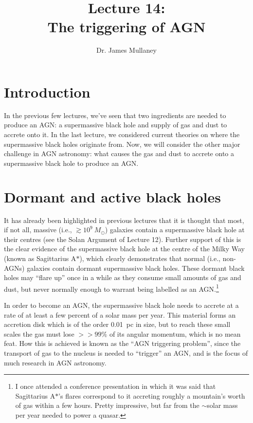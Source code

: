 \documentclass[11pt]{article}
\begin{document}
 
\title{Lecture 14:\\The triggering of AGN}
\author{Dr. James Mullaney}
\maketitle

\section{Introduction}
In the previous few lectures, we've seen that two ingredients
are needed to produce an AGN: a supermassive black hole and supply of
gas and dust to accrete onto it. In the last lecture, we considered
current theories on where the supermassive black holes originate from. Now,
we will consider the other major challenge in AGN astronomy: what
causes the gas and dust to accrete onto a supermassive black hole to
produce an AGN.

\section{Dormant and active black holes}
It has already been highlighted in previous lectures that it is
thought that most, if not all, massive (i.e., $\gtrsim10^9~{M_\odot}$)
galaxies contain a supermassive black hole at their centres (see the
Solan Argument of Lecture 12). Further support of this is the clear
evidence of the supermassive black hole at the centre of the Milky Way
(known as Sagittarius A$\ast$), which clearly demonstrates that normal
(i.e., non-AGNs) galaxies contain dormant supermassive black
holes. These dormant black holes may ``flare up'' once in a while as
they consume small amounts of gas and dust, but never normally enough
to warrant being labelled as an AGN.\footnote{I once attended a
  conference presentation in which it was said that Sagittarius
  A$\ast$'s flares correspond to it accreting roughly a mountain's
  worth of gas within a few hours. Pretty impressive, but far from the
  $\sim$solar mass per year needed to power a quasar.}

In order to become an AGN, the supermassive black hole needs to
accrete at a rate of at least a few percent of a solar mass per
year. This material forms an accretion disk which is of the order
0.01~pc in size, but to reach these small scales the gas must lose
$>>99\%$ of its angular momentum, which is no mean feat. How this is
achieved is known as the ``AGN triggering problem'', since the
transport of gas to the nucleus is needed to ``trigger'' an AGN, and
is the focus of much research in AGN astronomy.
\end{document}
